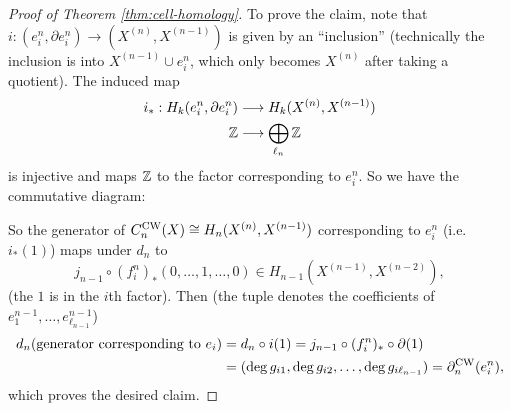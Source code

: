 \begin{proof}[Proof of Theorem \ref{thm:cell-homology}]
  To prove the claim, note that $i : (e_i^n, \partial e_i^n) \to (X^{(n)}, X^{(n - 1)})$
  is given by an ``inclusion'' (technically the inclusion
  is into $X^{(n - 1)} \cup e_i^n$, which only
  becomes $X^{(n)}$ after taking a quotient).
  The induced map
  \begin{align*}
    i_* : H_k(e_i^n, \partial e_i^n)
    &\longrightarrow H_k(X^{(n)}, X^{(n - 1)}) \\
    \mathbb{Z} & \longrightarrow \bigoplus_{\ell_n} \mathbb{Z}
  \end{align*}
  is injective and maps $\mathbb{Z}$ to the factor corresponding
  to $e_i^n$. So we have the commutative diagram:
  \begin{center}
  \end{center}
  So the generator of
  $C_n^{\mathrm{CW}}(X) \cong H_n(X^{(n)}, X^{(n - 1)})$
  corresponding to $e_i^n$ (i.e. $i_*(1)$) maps under
  $d_n$ to
  \[
    j_{n - 1} \circ (f_i^n)_*(0, \dots, 1, \dots, 0)
    \in H_{n - 1}(X^{(n - 1)}, X^{(n - 2)}),
  \]
  (the $1$ is in the $i$th factor). Then
  (the tuple denotes the coefficients of
  $e_1^{n - 1}, \dots, e_{\ell_{n - 1}}^{n - 1}$)
  \begin{align*}
    d_n(\text{generator corresponding to $e_i$})
    &= d_n \circ i(1)
    = j_{n - 1} \circ (f_i^n)_* \circ \partial (1) \\
    &= (\deg g_{i 1}, \deg g_{i 2}, \dots, \deg g_{i \ell_{n - 1}})
    = \partial_n^{\mathrm{CW}}(e_i^n),
  \end{align*}
  which proves the desired claim.
\end{proof}
